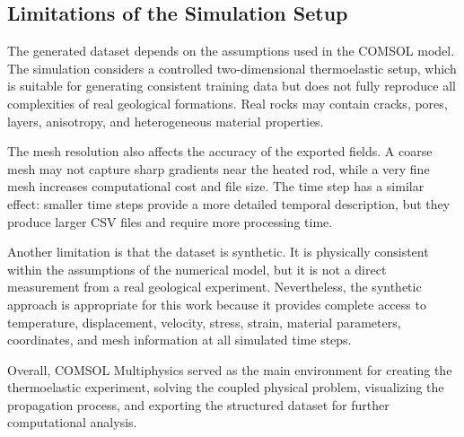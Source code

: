 \subsection{Limitations of the Simulation Setup}

The generated dataset depends on the assumptions used in the COMSOL model. The simulation considers a controlled two-dimensional thermoelastic setup, which is suitable for generating consistent training data but does not fully reproduce all complexities of real geological formations. Real rocks may contain cracks, pores, layers, anisotropy, and heterogeneous material properties.

The mesh resolution also affects the accuracy of the exported fields. A coarse mesh may not capture sharp gradients near the heated rod, while a very fine mesh increases computational cost and file size. The time step has a similar effect: smaller time steps provide a more detailed temporal description, but they produce larger CSV files and require more processing time.

Another limitation is that the dataset is synthetic. It is physically consistent within the assumptions of the numerical model, but it is not a direct measurement from a real geological experiment. Nevertheless, the synthetic approach is appropriate for this work because it provides complete access to temperature, displacement, velocity, stress, strain, material parameters, coordinates, and mesh information at all simulated time steps.

Overall, COMSOL Multiphysics served as the main environment for creating the thermoelastic experiment, solving the coupled physical problem, visualizing the propagation process, and exporting the structured dataset for further computational analysis.